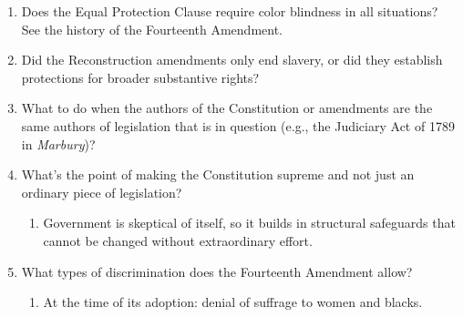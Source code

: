\begin{enumerate}
\begin{enumerate}
        \item \emph{National Federation of Independent Business v. Sebelius}.
        \item \emph{Bush v. Gore}.
        \item \emph{Brown v. Board of Education}.
        \item Federalist ``irreconcilables'' in the House ultimately caved and 
        cast their electoral votes for Jefferson.\footnote{Casebook p. 101.}
        \item If the Court's legitimacy depends on the other branches, is it 
        really a countermajoritarian institution?
    \end{enumerate}
    \item Does the Equal Protection Clause require color blindness in all 
    situations? See the history of the Fourteenth Amendment.
    \item Did the Reconstruction amendments only end slavery, or did they 
    establish protections for broader substantive rights?
    \item What to do when the authors of the Constitution or amendments are 
    the same authors of legislation that is in question (e.g., the Judiciary 
    Act of 1789 in \emph{Marbury})?
    \item What's the point of making the Constitution supreme and not just an 
    ordinary piece of legislation?
    \begin{enumerate}
        \item Government is skeptical of itself, so it builds in structural 
        safeguards that cannot be changed without extraordinary effort.
    \end{enumerate}
    \item What types of discrimination does the Fourteenth Amendment allow?
    \begin{enumerate}
        \item At the time of its adoption: denial of suffrage to women and 
        blacks.
    \end{enumerate}
\end{enumerate}

